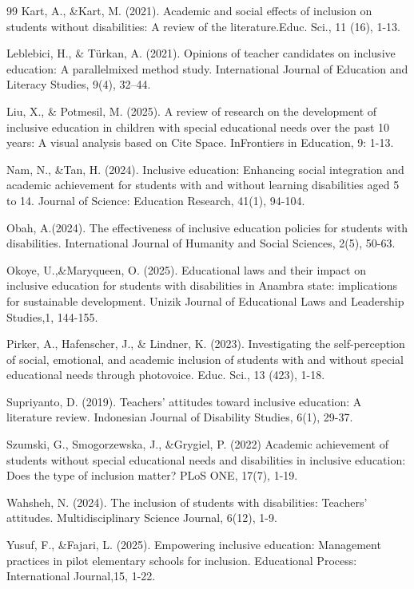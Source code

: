 \documentclass[10pt]{NSP1}
\begin{document}
\begin{thebibliography}{99}
Kart, A., \&Kart, M. (2021). Academic and social effects of inclusion on students without disabilities: A review of the literature.Educ. Sci., 11 (16), 1-13.

Leblebici, H., \& Türkan, A. (2021). Opinions of teacher candidates on inclusive education: A parallelmixed method study. International Journal of Education and Literacy Studies, 9(4), 32--44.

Liu, X., \& Potmesil, M. (2025). A review of research on the development of inclusive education in children with special educational needs over the past 10 years: A visual analysis based on Cite Space. InFrontiers in Education, 9: 1-13.

Nam, N., \&Tan, H. (2024). Inclusive education: Enhancing social integration and academic achievement for students with and without learning disabilities aged 5 to 14. Journal of Science: Education Research, 41(1), 94-104.

Obah, A.(2024). The effectiveness of inclusive education policies for students with disabilities. International Journal of Humanity and Social Sciences, 2(5), 50-63.

Okoye, U.,\&Maryqueen, O. (2025). Educational laws and their impact on inclusive education for students with disabilities in Anambra state: implications for sustainable development. Unizik Journal of Educational Laws and Leadership Studies,1, 144-155.

Pirker, A., Hafenscher, J., \& Lindner, K. (2023). Investigating the self-perception of social, emotional, and academic inclusion of students with and without special educational needs through photovoice. Educ. Sci., 13 (423), 1-18.

Supriyanto, D. (2019). Teachers' attitudes toward inclusive education: A literature review. Indonesian Journal of Disability Studies, 6(1), 29-37.

Szumski, G., Smogorzewska, J., \&Grygiel, P. (2022) Academic achievement of students without special educational needs and disabilities in inclusive education: Does the type of inclusion matter? PLoS ONE, 17(7), 1-19.

Wahsheh, N. (2024). The inclusion of students with disabilities: Teachers' attitudes. Multidisciplinary Science Journal, 6(12), 1-9.

Yusuf, F., \&Fajari, L. (2025). Empowering inclusive education: Management practices in pilot elementary schools for inclusion. Educational Process: International Journal,15, 1-22.

\end{thebibliography}
\end{document}
